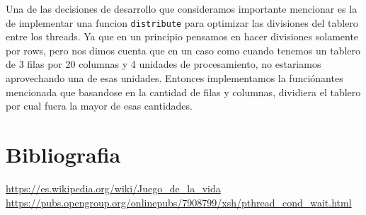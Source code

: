 \documentclass[]{article}
\begin{document}
Una de las decisiones de desarrollo que consideramos importante mencionar es la de implementar una funcion \verb|distribute| para optimizar las divisiones del tablero entre los threads. Ya que en un principio pensamos en hacer divisiones solamente por rows, pero nos dimos cuenta que en un caso como cuando tenemos un tablero de 3 filas por 20 columnas y 4 unidades de procesamiento, no estariamos aprovechando una de esas unidades. Entonces implementamos la funciónantes mencionada que basandose en la cantidad de filas y columnas, dividiera el tablero por cual fuera la mayor de esas cantidades.\\


\newpage
\section{Bibliografia}
\url{https://es.wikipedia.org/wiki/Juego_de_la_vida}\\
\url{https://pubs.opengroup.org/onlinepubs/7908799/xsh/pthread_cond_wait.html}\\
\end{document}
